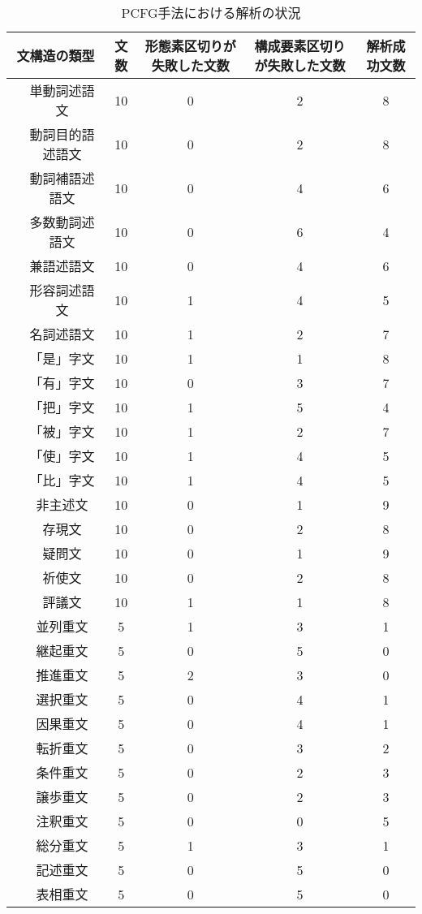 \documentclass[japanese]{jnlp_1.3a}
\begin{document}
\begin{table}[t]\centering
  \caption{PCFG手法における解析の状況}
  \footnotesize
  \begin{tabular}{|c|c|c|c|c|c|} \hline
\multicolumn{2}{|c|}{文構造の類型}&文数&
\parbox[c]{7zw}{形態素区切りが失敗した文数}&
\parbox[c]{8zw}{構成要素区切りが失敗した文数}&
解析成功文数 \\\hline
&単動詞述語文    & 10  &0 &2 &8 \\
&動詞目的語述語文&10 &0 &2 &8\\
&動詞補語述語文  & 10&0 &4 &6\\
&多数動詞述語文  &10 &0 &6 &4\\
&兼語述語文      &10  &0 &4 &6\\
&形容詞述語文&10 &1 &4 &5 \\
&名詞述語文      &10  &1&2 &7\\
& 「是」字文      & 10 &1 &1 &8\\
& 「有」字文      & 10 &0 &3 &7\\
& 「把」字文      & 10 &1 &5 &4\\
& 「被」字文      & 10 &1 &2 &7\\
& 「使」字文  &10 &1 &4 &5\\
& 「比」字文      & 10 &1 &4 &5\\
&非主述文        & 10 &0 &1 &9\\
&存現文          & 10 &0 &2 & 8\\
&疑問文          & 10 &0 &1 &9\\
&祈使文          & 10 &0 &2 &8\\
&評議文          &10  &1 &1 &8\\\hline
&並列重文        & 5 &1&3 &1\\
&継起重文&5&0&5 &0\\
&推進重文&5&2 &3 &0\\
&選択重文       &5 &0 &4 &1\\
&因果重文       &5 &0 &4 &1\\
&転折重文       &5 &0 &3 &2\\
&条件重文       &5 &0 &2 &3\\
&譲歩重文       &5 &0 &2 &3\\
&注釈重文       &5 &0 &0 &5\\
&総分重文       &5 &1 &3 &1\\
&記述重文       &5 &0 &5 &0\\
&表相重文       &5 &0 &5 &0\\\hline
  \end{tabular}
  \label{tab:resict1}
\end{table}
\end{document}
